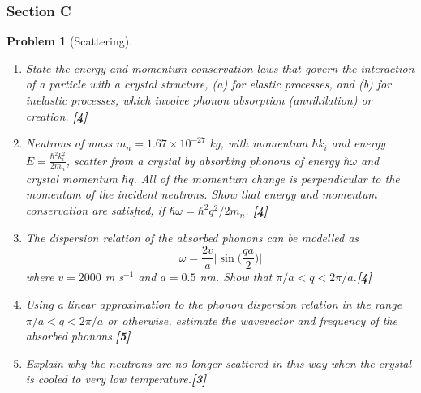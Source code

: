 \documentclass[a4paper]{article}
\theoremstyle{new}
\newtheorem{qns}{Problem}[subsection]
\begin{document}
\subsubsection{Section C}
\begin{qns}[Scattering]\leavevmode
\begin{enumerate}[label=(\roman*)]
\item State the energy and momentum conservation laws that govern the interaction of a particle with a crystal structure, (a) for elastic processes, and (b) for inelastic processes,
which involve phonon absorption (annihilation) or creation. \hfill\textbf{[4]}
\item Neutrons of mass $m_n = 1.67 \times 10^{−27}$ kg, with momentum $\hbar k_i$ and energy $E=\frac{\hbar^2k_i^2}{2m_n}$, scatter from a crystal by absorbing phonons of energy $\hbar\omega$ and crystal momentum $\hbar q$. All of the momentum change is perpendicular to the momentum of the incident neutrons. Show that energy and momentum conservation are satisfied, if $\hbar\omega=\hbar^2q^2/2m_n$. \hfill\textbf{[4]}
\item The dispersion relation of the absorbed phonons can be modelled as
$$\omega=\frac{2v}{a}\bigg|\sin\bigg(\frac{qa}{2}\bigg)\bigg|$$
where $v = 2000$ m s$^{−1}$ and $a = 0.5$ nm. Show that $\pi/a<q<2\pi/a$.\hfill\textbf{[4]}
\item Using a linear approximation to the phonon dispersion relation in the range $\pi/a<q<2\pi/a$ or otherwise, estimate the wavevector and frequency of the absorbed phonons.\hfill\textbf{[5]}
\item Explain why the neutrons are no longer scattered in this way when the crystal is cooled to very low temperature.\hfill\textbf{[3]}
\end{enumerate}
\end{qns}
\end{document}
